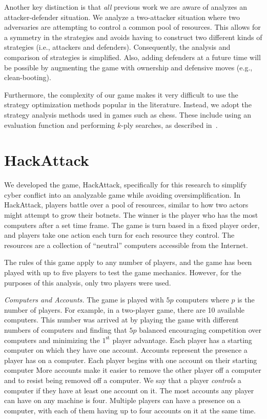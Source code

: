 \documentclass{sig-alternate-05-2015}
\begin{document}
Another key distinction is that {\em all} previous work we are aware
of analyzes an attacker-defender situation. We analyze a two-attacker
situation where two adversaries are attempting to control a common
pool of resources. This allows for a symmetry in the strategies and
avoids having to construct two different kinds of strategies (i.e.,
attackers and defenders). Consequently, the analysis and comparison of
strategies is simplified. Also, adding defenders at a future time will
be possible by augmenting the game with ownership and defensive moves
(e.g., clean-booting).

Furthermore, the complexity of our game makes it very difficult to use
the strategy optimization methods popular in the literature. Instead,
we adopt the strategy analysis methods used in games such as
chess. These include using an evaluation function and performing
$k$-ply searches, as described in~\cite{levy2009computer,shannon1950programming}.


\section{HackAttack}
\label{sec:hackattack}
We developed the game, HackAttack, specifically for this research to simplify cyber conflict into an analyzable game while avoiding oversimplification. 
In HackAttack, players battle over a pool of resources, similar to how two actors might attempt to grow their botnets. 
The winner is the player who has the most computers after a set time frame. 
The game is turn based in a fixed player order, and players take one action each turn for each resource they control. The resources are a collection of ``neutral'' computers accessible from the Internet. 

The rules of this game apply to any number of players, and the game has been played with up to five players to test the game mechanics. However, for the purposes of this analysis, only two players were used. 

{\em Computers and Accounts.}
The game is played with $5p$ computers where $p$ is the number of players.
For example, in a two-player game, there are 10 available computers.
This number was arrived at by playing the game with different numbers of computers and finding that $5p$ balanced encouraging competition over computers and minimizing the $1^{\mbox{st}}$ player advantage.
Each player has a starting computer on which they have one account.
Accounts represent the presence a player has on a computer. Each player begins with one account on their starting computer
More accounts make it easier to remove the other player off a computer and to resist being removed off a computer.
We say that a player {\em controls} a computer if they have at least one account on it.
The most accounts any player can have on any machine is four. 
Multiple players can have a presence on a computer, with each of them having up to four accounts on it at the same time. 
\end{document}

